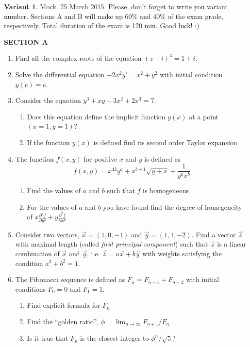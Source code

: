 \documentclass[12pt,a4paper]{article}
\begin{document}
\thispagestyle{empty}
\textbf{Variant 1}. Mock. 25 March 2015. Please, don't forget to write you variant number. Sections A and B will make up 60\% and 40\% of the exam grade, respectively. Total duration of the exam is 120 min. Good luck! :) 



\textbf{SECTION A}

\begin{enumerate}

\item Find all the complex roots of the equation $(z+i)^3=1+i$.

\item Solve the differential equation $-2x^2y'=x^2+y^2$ with initial condition $y(e)=e$.

\item Consider the equation $y^3+xy+3x^2+2x^3=7$. 
\begin{enumerate}
\item Does this equation define the implicit function $y(x)$ at a point $(x=1,y=1)$?
\item If the function $y(x)$ is defined find its second order Taylor expansion
\end{enumerate}

\item The function $f(x,y)$ for positive $x$ and $y$ is defined as
\[
f(x,y)=x^{42}y^a + x^{b+1}\sqrt{y+x}+\frac{1}{y^a x^b}
\]

\begin{enumerate}
\item Find the values of $a$ and $b$ such that $f$ is homogeneous
\item For the values of  $a$ and $b$ you have found find the degree of homegeneity of $x\frac{\partial^2 f}{\partial y^2} +y\frac{\partial^2 f}{\partial x^2}$
\end{enumerate}

\item Consider two vectors, $\vec{x}=(1,0,-1)$ and $\vec{y}=(1,1,-2)$. Find a vector $\vec{z}$ with maximal length (called \textit{first principal component}) such that $\vec{z}$ is a linear combination of $\vec{x}$ and $\vec{y}$, i.e. $\vec{z}=a \vec{x} + b \vec{y}$ with weights satisfying the condition $a^2+b^2=1$.

\item The Fibonacci sequence is defined as $F_n=F_{n-1}+F_{n-2}$ with initial conditions $F_0=0$ and $F_1=1$. 
\begin{enumerate}
\item Find explicit formula for $F_n$
\item Find the ``golden ratio'', $\phi=\lim_{n\to\infty} F_{n+1}/F_n$
\item Is it true that $F_n$ is the closest integer to $\phi^n/\sqrt{5}$?
\end{enumerate}



\end{enumerate}
\end{document}
